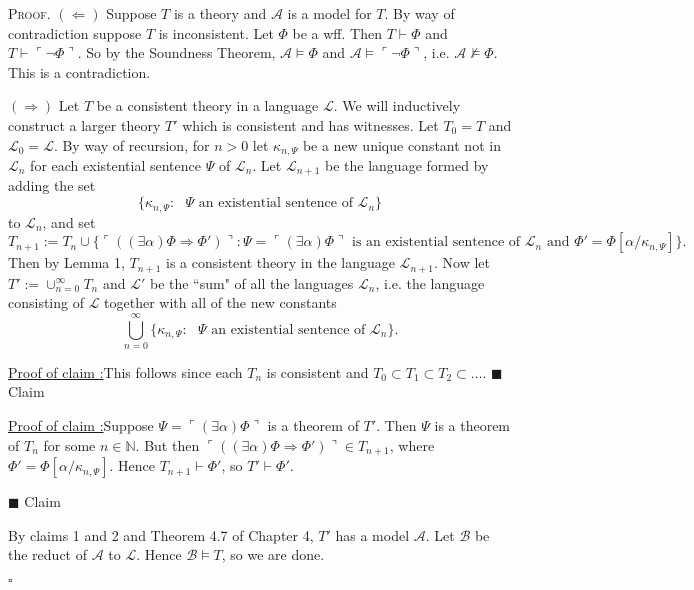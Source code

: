\documentclass[12pt]{article}
\newcounter{ProofCounter}
\newcounter{ClaimCounter}[ProofCounter]
\newenvironment{Proof}{\stepcounter{ProofCounter}\textsc{Proof.}}{\hfill$\square$}
\newenvironment{claim}[1]{\vspace{1mm}\stepcounter{ClaimCounter}\par\noindent\underline{\bf Claim \theClaimCounter:}\space#1}{}
\newenvironment{claimproof}[1]{\par\noindent\underline{Proof of claim \theClaimCounter:}\space#1}{\hfill $\blacksquare$ Claim \theClaimCounter}
\begin{document}
\begin{Proof}
  $(\Leftarrow)$ Suppose $T$ is a theory and $\mathcal{A}$ is a model for $T$. By way of contradiction suppose $T$ is inconsistent. Let $\Phi$ be a
  wff. Then $T \vdash \Phi$ and $T \vdash \ulcorner \neg \Phi \urcorner$. So by the Soundness Theorem, $\mathcal{A} \models \Phi$ and $\mathcal{A}
  \models \ulcorner \neg \Phi \urcorner$, i.e. $\mathcal{A} \not \models \Phi$. This is a contradiction.

  $(\Rightarrow)$ Let $T$ be a consistent theory in a language $\mathcal{L}$. We will inductively construct a larger theory $T'$ which is
  consistent and has witnesses.
  Let $T_0 = T$ and $\mathcal{L}_0 = \mathcal{L}$. By way of recursion, for $n > 0$ let $\kappa_{n,\Psi}$ be a new unique constant not in $\mathcal{L}_n$
  for each existential sentence $\Psi$ of $\mathcal{L}_n$. Let $\mathcal{L}_{n+1}$ be the language formed by adding the set 
  \[ \{ \kappa_{n,\Psi}: \text{ $\Psi$ an existential sentence of $\mathcal{L}_n$} \} \] to
  $\mathcal{L}_n$, and set
  \[
    T_{n+1} := T_n \cup \{ \ulcorner ((\exists \alpha) \Phi \Rightarrow \Phi') \urcorner : \Psi = \ulcorner (\exists \alpha) \Phi \urcorner \text{ is an
    existential sentence of $\mathcal{L}_n$ and $\Phi' = \Phi[\alpha / \kappa_{n,\Psi}]$} \}.
  \]
  Then by Lemma 1, $T_{n+1}$ is
  a consistent theory in the language $\mathcal{L}_{n+1}$. Now let $T' := \cup_{n=0}^{\infty} T_{n}$ and $\mathcal{L}'$ be the ``sum" of all the languages
  $\mathcal{L}_n$, i.e. the language consisting of $\mathcal{L}$ together with all of the new constants 
  \[ 
    \bigcup_{n=0}^{\infty} \{ \kappa_{n,\Psi} : \text{ $\Psi$ an existential sentence of $\mathcal{L}_{n}$} \}.
  \]

  \begin{claimproof}
    This follows since each $T_{n}$ is consistent and $T_0 \subset T_1 \subset T_2 \subset \dots$.
  \end{claimproof}

  \begin{claimproof}
    Suppose $\Psi = \ulcorner (\exists \alpha) \Phi \urcorner$ is a theorem of $T'$. Then $\Psi$ is a theorem of $T_n$ for some $n \in \mathbb{N}$.
    But then $\ulcorner ((\exists \alpha) \Phi \Rightarrow \Phi') \urcorner \in T_{n+1}$, where $\Phi' = \Phi[\alpha / \kappa_{n,\Psi}]$. Hence
    $T_{n+1} \vdash \Phi'$, so $T' \vdash \Phi'$.

  \end{claimproof}

  By claims 1 and 2 and Theorem 4.7 of Chapter 4, $T'$ has a model $\mathcal{A}$. Let $\mathcal{B}$ be the reduct of $\mathcal{A}$ to $\mathcal{L}$.
  Hence $\mathcal{B} \models T$, so we are done.
  
\end{Proof}
\end{document}
